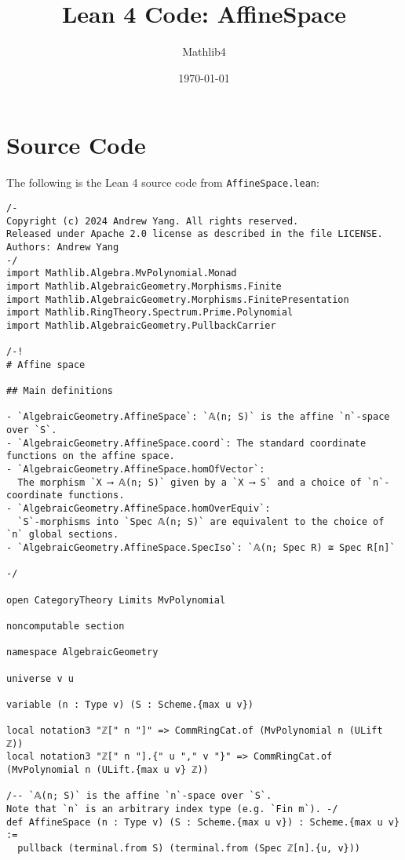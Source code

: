 \documentclass{article}
\title{Lean 4 Code: AffineSpace}
\author{Mathlib4}
\date{\today}
\begin{document}
\maketitle

\section{Source Code}

The following is the Lean 4 source code from \texttt{AffineSpace.lean}:

\begin{lstlisting}[language=Lean, caption={AffineSpace.lean}]
/-
Copyright (c) 2024 Andrew Yang. All rights reserved.
Released under Apache 2.0 license as described in the file LICENSE.
Authors: Andrew Yang
-/
import Mathlib.Algebra.MvPolynomial.Monad
import Mathlib.AlgebraicGeometry.Morphisms.Finite
import Mathlib.AlgebraicGeometry.Morphisms.FinitePresentation
import Mathlib.RingTheory.Spectrum.Prime.Polynomial
import Mathlib.AlgebraicGeometry.PullbackCarrier

/-!
# Affine space

## Main definitions

- `AlgebraicGeometry.AffineSpace`: `𝔸(n; S)` is the affine `n`-space over `S`.
- `AlgebraicGeometry.AffineSpace.coord`: The standard coordinate functions on the affine space.
- `AlgebraicGeometry.AffineSpace.homOfVector`:
  The morphism `X ⟶ 𝔸(n; S)` given by a `X ⟶ S` and a choice of `n`-coordinate functions.
- `AlgebraicGeometry.AffineSpace.homOverEquiv`:
  `S`-morphisms into `Spec 𝔸(n; S)` are equivalent to the choice of `n` global sections.
- `AlgebraicGeometry.AffineSpace.SpecIso`: `𝔸(n; Spec R) ≅ Spec R[n]`

-/

open CategoryTheory Limits MvPolynomial

noncomputable section

namespace AlgebraicGeometry

universe v u

variable (n : Type v) (S : Scheme.{max u v})

local notation3 "ℤ[" n "]" => CommRingCat.of (MvPolynomial n (ULift ℤ))
local notation3 "ℤ[" n "].{" u "," v "}" => CommRingCat.of (MvPolynomial n (ULift.{max u v} ℤ))

/-- `𝔸(n; S)` is the affine `n`-space over `S`.
Note that `n` is an arbitrary index type (e.g. `Fin m`). -/
def AffineSpace (n : Type v) (S : Scheme.{max u v}) : Scheme.{max u v} :=
  pullback (terminal.from S) (terminal.from (Spec ℤ[n].{u, v}))


\end{lstlisting}
\end{document}
